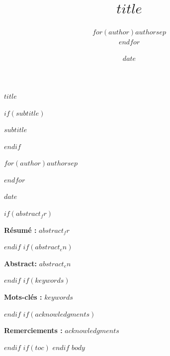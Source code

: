 \documentclass[11pt]{article}
\title{$title$}
\author{$for(author)$$author$$sep$ \\ $endfor$}
\date{$date$}
\renewcommand{\maketitle}{
  \begin{center}
  \vspace*{1cm}
  
  \begin{minipage}{\textwidth}
  \centering
  \fontsize{20}{26}\selectfont\textbf{$title$}
  \end{minipage}
  
  \vspace{2.4cm}
  
  $if(subtitle)$
  \begin{minipage}{\textwidth}
  \centering
  \fontsize{13}{16}\selectfont\itshape $subtitle$
  \end{minipage}
  $endif$
  
  \vspace{2.6cm}
  
  \begin{minipage}{\textwidth}
  \centering
  \Large
  $for(author)$$author$$sep$ \par $endfor$
  \end{minipage}
  
  \vspace{2.6cm}
  
  \Large $date$
  
  \end{center}
  \vspace{1cm}
}
\begin{document}
\maketitle
\thispagestyle{firstpage}
$if(abstract_fr)$
\begin{center}
\begin{minipage}{0.85\textwidth}
\noindent \textbf{Résumé :} $abstract_fr$
\end{minipage}
\end{center}
\vspace{0.5cm}
$endif$
$if(abstract_en)$
\begin{center}
\begin{minipage}{0.85\textwidth}
\noindent \textbf{Abstract:} $abstract_en$
\end{minipage}
\end{center}
\vspace{0.5cm}
$endif$
$if(keywords)$
\begin{center}
\begin{minipage}{0.85\textwidth}
\noindent \textbf{Mots-clés :} $keywords$
\end{minipage}
\end{center}
\vspace{0.5cm}
$endif$
$if(acknowledgments)$
\begin{center}
\begin{minipage}{0.85\textwidth}
\noindent \textbf{Remerciements :} $acknowledgments$
\end{minipage}
\end{center}
\vspace{1cm}
$endif$
$if(toc)$
\clearpage
\tableofcontents
\clearpage
$endif$
\clearpage
\pagestyle{fancy}
$body$
\printbibliography[title={Références}]
\end{document}
